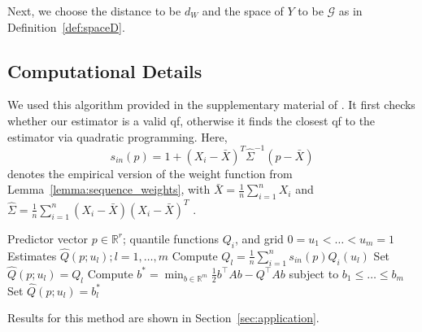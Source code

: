\ifshowpostsub

\fi

Next, we choose the distance to be $d_W$ and the space of $Y$ to be $\mathcal{G}$ as in Definition~\ref{def:spaceD}.
\subsection{Computational Details}
\label{sec:computation}
We used this algorithm provided in the supplementary material of \textcite{PetersenLiuDivani2021}.
It first checks whether our estimator is a valid qf, otherwise it finds the closest qf
to the estimator via quadratic programming. Here,
\[
    s_{in}(p) = 1 + (X_i - \bar{X})^T \hat{\Sigma}^{-1} (p - \bar{X})
\]
denotes the empirical version of the weight function from Lemma~\ref{lemma:sequence_weights},
with $\bar{X} = \frac{1}{n} \sum_{i=1}^{n} X_i$ and
$\hat{\Sigma} = \frac{1}{n} \sum_{i=1}^{n} (X_i - \bar{X})(X_i - \bar{X})^T$
\parencite[cf.][]{PetersenMüller2019}.
\begin{algorithm}
    \caption{Estimating \(\hat{Q}(p)\)}
    \label{alg:quadprog}
    \begin{algorithmic}[1]
    \Require Predictor vector \( p \in \mathbb{R}^r \); quantile functions \( Q_i \), and grid \( 0 = u_1 < \ldots < u_m = 1 \)
    \Ensure Estimates \( \hat{Q}(p; u_l); l = 1, \ldots, m \)
        \State Compute \( Q_l = \frac{1}{n} \sum_{i=1}^{n} s_{in}(p) Q_i(u_l) \)
    \EndFor
        \State Set \( \hat{Q}(p; u_l) = Q_l \)
    \Else
        \State Compute \( b^* = \min_{b \in \mathbb{R}^m} \frac{1}{2} b^\top A b - Q^\top A b \) subject to \( b_1 \leq \ldots \leq b_m \)
        \State Set \( \hat{Q}(p; u_l) = b^*_l \)
    \EndIf
    \end{algorithmic}
\end{algorithm}

Results for this method are shown in Section~\ref{sec:application}. 
